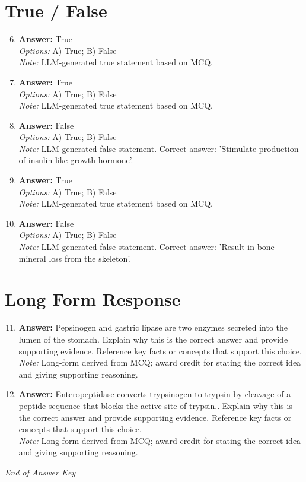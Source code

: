 \documentclass[12pt]{article}
\begin{document}
\section*{True / False}
\begin{enumerate}[label=\arabic*.]
\setcounter{enumi}{5}
\item \textbf{Answer:} True
\\ \textit{Options:} A) True; B) False
\\ \textit{Note:} LLM-generated true statement based on MCQ.
\item \textbf{Answer:} True
\\ \textit{Options:} A) True; B) False
\\ \textit{Note:} LLM-generated true statement based on MCQ.
\item \textbf{Answer:} False
\\ \textit{Options:} A) True; B) False
\\ \textit{Note:} LLM-generated false statement. Correct answer: 'Stimulate production of insulin-like growth hormone'.
\item \textbf{Answer:} True
\\ \textit{Options:} A) True; B) False
\\ \textit{Note:} LLM-generated true statement based on MCQ.
\item \textbf{Answer:} False
\\ \textit{Options:} A) True; B) False
\\ \textit{Note:} LLM-generated false statement. Correct answer: 'Result in bone mineral loss from the skeleton'.
\end{enumerate}

\section*{Long Form Response}
\begin{enumerate}[label=\arabic*.]
\setcounter{enumi}{10}
\item \textbf{Answer:} Pepsinogen and gastric lipase are two enzymes secreted into the lumen of the stomach. Explain why this is the correct answer and provide supporting evidence. Reference key facts or concepts that support this choice.
\\ \textit{Note:} Long-form derived from MCQ; award credit for stating the correct idea and giving supporting reasoning.
\item \textbf{Answer:} Enteropeptidase converts trypsinogen to trypsin by cleavage of a peptide sequence that blocks the active site of trypsin.. Explain why this is the correct answer and provide supporting evidence. Reference key facts or concepts that support this choice.
\\ \textit{Note:} Long-form derived from MCQ; award credit for stating the correct idea and giving supporting reasoning.
\end{enumerate}

\vfill
\noindent\textit{End of Answer Key}
\end{document}
